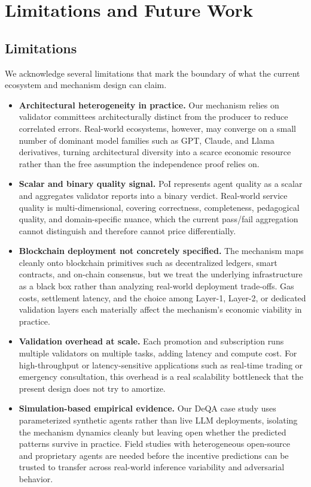 \section{Limitations and Future Work}
\label{sec:limitations_and_future_work}

\subsection{Limitations}
\label{sec:limitations}

We acknowledge several limitations that mark the boundary of what the current ecosystem and mechanism design can claim.

\begin{itemize}[leftmargin=1.5em, itemsep=4pt, topsep=2pt]
    \item \textbf{Architectural heterogeneity in practice.} Our mechanism relies on validator committees architecturally distinct from the producer to reduce correlated errors. Real-world ecosystems, however, may converge on a small number of dominant model families such as GPT, Claude, and Llama derivatives, turning architectural diversity into a scarce economic resource rather than the free assumption the independence proof relies on.

    \item \textbf{Scalar and binary quality signal.} PoI represents agent quality as a scalar and aggregates validator reports into a binary verdict. Real-world service quality is multi-dimensional, covering correctness, completeness, pedagogical quality, and domain-specific nuance, which the current pass/fail aggregation cannot distinguish and therefore cannot price differentially.

    \item \textbf{Blockchain deployment not concretely specified.} The mechanism maps cleanly onto blockchain primitives such as decentralized ledgers, smart contracts, and on-chain consensus, but we treat the underlying infrastructure as a black box rather than analyzing real-world deployment trade-offs. Gas costs, settlement latency, and the choice among Layer-1, Layer-2, or dedicated validation layers each materially affect the mechanism's economic viability in practice.

    \item \textbf{Validation overhead at scale.} Each promotion and subscription runs multiple validators on multiple tasks, adding latency and compute cost. For high-throughput or latency-sensitive applications such as real-time trading or emergency consultation, this overhead is a real scalability bottleneck that the present design does not try to amortize.

    \item \textbf{Simulation-based empirical evidence.} Our DeQA case study uses parameterized synthetic agents rather than live LLM deployments, isolating the mechanism dynamics cleanly but leaving open whether the predicted patterns survive in practice. Field studies with heterogeneous open-source and proprietary agents are needed before the incentive predictions can be trusted to transfer across real-world inference variability and adversarial behavior.
\end{itemize}

